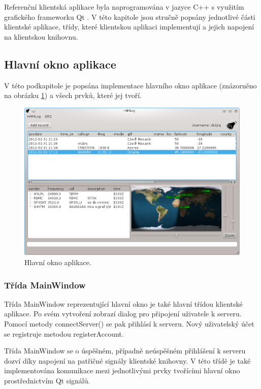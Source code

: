 Referenční klientská aplikace byla naprogramována v jazyce C++ s využitím grafického frameworku Qt \cite{qt}. V této kapitole jsou stručně
popsány jednotlivé části klientské aplikace, třídy, které klientskou aplikaci implementují a jejich napojení na klientskou knihovnu.

\subsection{Hlavní okno aplikace}

V této podkapitole je popsána implementace hlavního okno aplikace (znázorněno na obrázku \ref{fig:okno}) a všech prvků, které jej tvoří.

\begin{figure}[h]
\centering
\includegraphics[trim=0cm 0cm 0cm 0cm, scale=0.7]{fig/ham3}
\caption{Hlavní okno aplikace.}
\label{fig:okno}
\end{figure}

\subsubsection{Třída MainWindow}

Třída MainWindow reprezentující hlavní okno je také hlavní třídou klientské aplikace. Po svém vytvoření zobrazí dialog
pro připojení uživatele k serveru. Pomocí metody connectServer() se pak přihlásí
k serveru. Nový uživatelský
účet se registruje metodou registerAccount.

Třída MainWindow se o úspěšném, případně neúspěšném přihlášení k serveru dozví díky napojení
na patřičné signály klientské knihovny. V této třídě je také implementována komunikace mezi jednotlivými prvky tvořícími hlavní okno
prostřednictvím Qt signálů.

